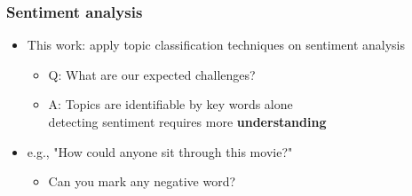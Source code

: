 \documentclass{beamer}
\begin{document}
\begin{frame}
	\frametitle{Sentiment analysis}
	\begin{itemize}
	\item This work: apply topic classification techniques on sentiment analysis
	\begin{itemize}
		\item Q: What are our expected challenges?
		\pause %
		\item A: Topics are identifiable by key words alone \\ detecting sentiment requires more \textbf{understanding}
	\end{itemize}
	\end{itemize}
	
	\pause %
	\begin{itemize}
		\item e.g., "How could anyone sit through this movie?"
		\begin{itemize}
			\item Can you mark  any negative word?
		\end{itemize}
	
	\end{itemize}
	
	

\end{frame}
\fi
\end{document}
